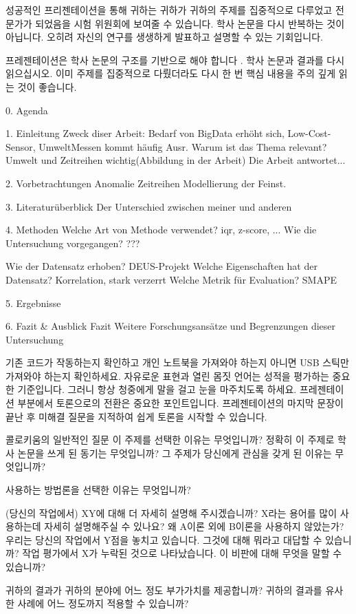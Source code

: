 성공적인 프리젠테이션을 통해 귀하는 귀하가 귀하의 주제를 집중적으로 다루었고 전문가가 되었음을 시험 위원회에 보여줄 수 있습니다.
학사 논문을 다시 반복하는 것이 아닙니다. 오히려 자신의 연구를 생생하게 발표하고 설명할 수 있는 기회입니다.

프레젠테이션은 학사 논문의 구조를 기반으로 해야 합니다 .
학사 논문과 결과를 다시 읽으십시오. 이미 주제를 집중적으로 다뤘더라도 다시 한 번 핵심 내용을 주의 깊게 읽는 것이 좋습니다.


0. Agenda

1. Einleitung
    Zweck diser Arbeit: Bedarf von BigData erhöht sich, Low-Cost-Sensor, UmweltMessen kommt häufig Ausr.
    Warum ist das Thema relevant? Umwelt und Zeitreihen wichtig(Abbildung in der Arbeit)
    Die Arbeit antwortet... 

2. Vorbetrachtungen
    Anomalie
    Zeitreihen
    Modellierung der Feinst.

3. Literaturüberblick
    Der Unterschied zwischen meiner und anderen

4. Methoden
    Welche Art von Methode verwendet? iqr, z-score, ...
    Wie die Untersuchung vorgegangen? ???

    Wie der Datensatz erhoben?  DEUS-Projekt
    Welche Eigenschaften hat der Datensatz? Korrelation, stark verzerrt
    Welche Metrik für Evaluation?  SMAPE

5. Ergebnisse

6. Fazit & Ausblick
    Fazit
    Weitere Forschungsansätze und Begrenzungen dieser Untersuchung








기존 코드가 작동하는지 확인하고 개인 노트북을 가져와야 하는지 아니면 USB 스틱만 가져와야 하는지 확인하세요.
자유로운 표현과 열린 몸짓 언어는 성적을 평가하는 중요한 기준입니다. 그러니 항상 청중에게 말을 걸고 눈을 마주치도록 하세요.
프레젠테이션 부분에서 토론으로의 전환은 중요한 포인트입니다. 프레젠테이션의 마지막 문장이 끝난 후 미해결 질문을 지적하여 쉽게 토론을 시작할 수 있습니다.




콜로키움의 일반적인 질문
    이 주제를 선택한 이유는 무엇입니까?
    정확히 이 주제로 학사 논문을 쓰게 된 동기는 무엇입니까?
    그 주제가 당신에게 관심을 갖게 된 이유는 무엇입니까?

    사용하는 방법론을 선택한 이유는 무엇입니까?

    (당신의 작업에서) XY에 대해 더 자세히 설명해 주시겠습니까?
    X라는 용어를 많이 사용하는데 자세히 설명해주실 수 있나요?
    왜 A이론 외에 B이론을 사용하지 않았는가?
    우리는 당신의 작업에서 Y점을 놓치고 있습니다. 그것에 대해 뭐라고 대답할 수 있습니까?
    작업 평가에서 X가 누락된 것으로 나타났습니다. 이 비판에 대해 무엇을 말할 수 있습니까?

    귀하의 결과가 귀하의 분야에 어느 정도 부가가치를 제공합니까?
    귀하의 결과를 유사한 사례에 어느 정도까지 적용할 수 있습니까?